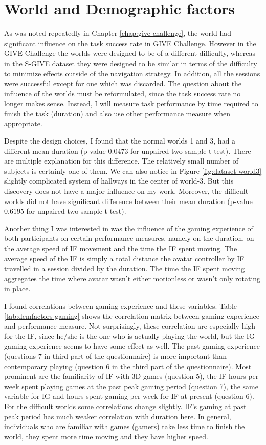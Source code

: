 \section{World and Demographic factors}
\label{sec:world-demo-factors}
As was noted repeatedly in Chapter \ref{chap:give-challenge}, the world had significant influence on the task success rate in GIVE Challenge. However in the GIVE Challenge the worlds were designed to be of a different difficulty, whereas in the S-GIVE dataset they were designed to be similar in terms of the difficulty to minimize effects outside of the navigation strategy. In addition, all the sessions were successful except for one which was discarded. The question about the influence of the worlds must be reformulated, since the task success rate no longer makes sense. Instead, I will measure task performance by time required to finish the task (duration) and also use other performance measure when appropriate.

Despite the design choices, I found that the normal worlds 1 and 3, had a different mean duration (p-value $0.0473$ for unpaired two-sample t-test). There are multiple explanation for this difference. The relatively small number of subjects is certainly one of them. We can also notice in Figure \ref{fig:dataset-world3} slightly complicated system of hallways in the center of world-3. But this discovery does not have a major influence on my work. Moreover, the difficult worlds did not have significant difference between their mean duration (p-value $0.6195$ for unpaired two-sample t-test).

Another thing I was interested in was the influence of the gaming experience of both participants on certain performance measures, namely on the duration, on the average speed of IF movement and the time the IF spent moving. The average speed of the IF is simply a total distance the avatar controller by IF travelled in a session divided by the duration. The time the IF spent moving aggregates the time where avatar wasn't either motionless or wasn't only rotating in place. 

I found correlations between gaming experience and these variables. Table \ref{tab:demfactors-gaming} shows the correlation matrix between gaming experience and performance measure.  Not surprisingly, these correlation are especially high for the IF, since he/she is the one who is actually playing the world, but the IG gaming experience seems to have some effect as well. The past gaming experience (questions 7 in third part of the questionnaire) is more important than contemporary playing (question 6 in the third part of the questionnaire). Most prominent are the familiarity of IF with 3D games (question 5),  the IF hours per week spent playing games at the past peak gaming period (question 7), the same variable for IG and hours spent gaming per week for IF at present (question 6). For the difficult worlds some correlations change slightly. IF's gaming at past peak period has much weaker correlation with duration here. In general, individuals who are familiar with games (gamers) take less time to finish the world, they spent more time moving and they have higher speed.


